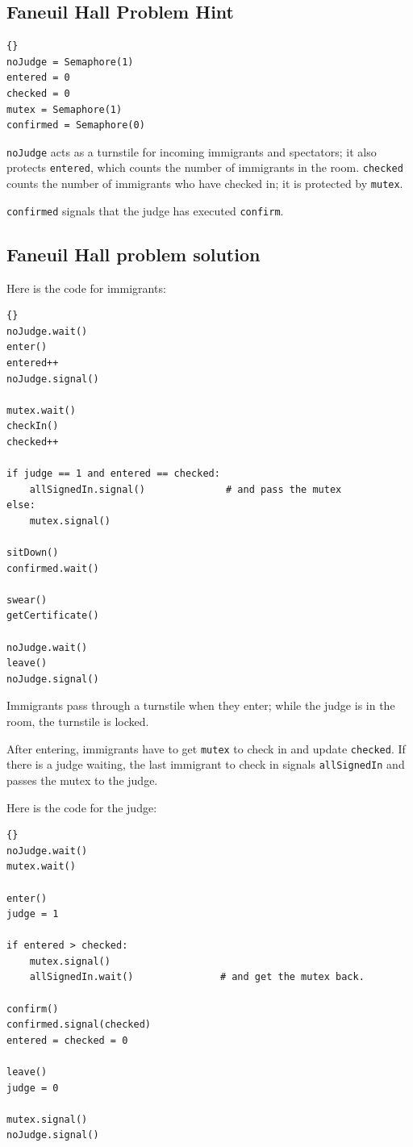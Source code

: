 \documentclass{book}
\newcommand{\clearemptydoublepage}{\newpage\cleardoublepage}
\begin{document}
\clearemptydoublepage
\subsection {Faneuil Hall Problem Hint}

\begin{lstlisting}[title={Faneuil Hall problem hint}]{}
noJudge = Semaphore(1)
entered = 0
checked = 0
mutex = Semaphore(1)
confirmed = Semaphore(0)
\end{lstlisting}

{\tt noJudge} acts as a turnstile for incoming immigrants and
spectators; it also protects {\tt entered}, which counts the
number of immigrants in the room.  {\tt checked} counts the
number of immigrants who have checked in; it is protected by
{\tt mutex}.

{\tt confirmed} signals that the judge has executed {\tt confirm}.


\clearemptydoublepage
\subsection {Faneuil Hall problem solution}

Here is the code for immigrants:

\begin{lstlisting}[title={Faneuil Hall problem solution (immigrant)}]{}
noJudge.wait()
enter()
entered++
noJudge.signal()

mutex.wait()
checkIn()
checked++

if judge == 1 and entered == checked:
    allSignedIn.signal()              # and pass the mutex
else:
    mutex.signal()

sitDown()
confirmed.wait()

swear()
getCertificate()

noJudge.wait()
leave()
noJudge.signal()
\end{lstlisting}

Immigrants pass through a turnstile when they enter; while the
judge is in the room, the turnstile is locked.

After entering, immigrants have to get {\tt mutex} to check 
in and update {\tt checked}.  If there is a judge waiting, the
last immigrant to check in signals {\tt allSignedIn} and passes
the mutex to the judge.

Here is the code for the judge:

\begin{lstlisting}[title={Faneuil Hall problem solution (judge)}]{}
noJudge.wait()
mutex.wait()

enter()
judge = 1

if entered > checked:
    mutex.signal()
    allSignedIn.wait()               # and get the mutex back.

confirm()
confirmed.signal(checked)
entered = checked = 0

leave()
judge = 0

mutex.signal()
noJudge.signal()
\end{lstlisting}
\end{document}
